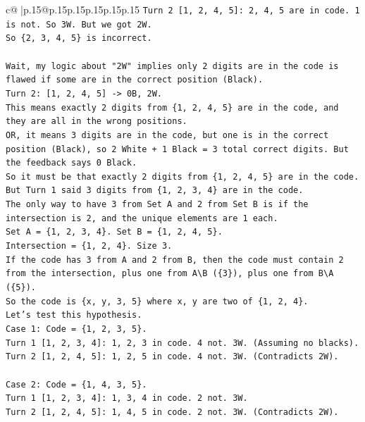 \documentclass{article}
\begin{document}
{\begin{supertabular}{c@{$\;$}|p{.15\linewidth}@{}p{.15\linewidth}p{.15\linewidth}p{.15\linewidth}p{.15\linewidth}p{.15\linewidth}}
{{{\texttt{Turn 2 {[}1, 2, 4, 5{]}: 2, 4, 5 are in code. 1 is not. So 3W. But we got 2W.} \\
\texttt{So \{2, 3, 4, 5\} is incorrect.} \\
\\ 
\texttt{Wait, my logic about "2W" implies only 2 digits are in the code is flawed if some are in the correct position (Black).} \\
\texttt{Turn 2: {[}1, 2, 4, 5{]} {-}> 0B, 2W.} \\
\texttt{This means exactly 2 digits from \{1, 2, 4, 5\} are in the code, and they are all in the wrong positions.} \\
\texttt{OR, it means 3 digits are in the code, but one is in the correct position (Black), so 2 White + 1 Black = 3 total correct digits. But the feedback says 0 Black.} \\
\texttt{So it must be that exactly 2 digits from \{1, 2, 4, 5\} are in the code.} \\
\texttt{But Turn 1 said 3 digits from \{1, 2, 3, 4\} are in the code.} \\
\texttt{The only way to have 3 from Set A and 2 from Set B is if the intersection is 2, and the unique elements are 1 each.} \\
\texttt{Set A = \{1, 2, 3, 4\}. Set B = \{1, 2, 4, 5\}.} \\
\texttt{Intersection = \{1, 2, 4\}. Size 3.} \\
\texttt{If the code has 3 from A and 2 from B, then the code must contain 2 from the intersection, plus one from A\textbackslash{}B (\{3\}), plus one from B\textbackslash{}A (\{5\}).} \\
\texttt{So the code is \{x, y, 3, 5\} where x, y are two of \{1, 2, 4\}.} \\
\texttt{Let's test this hypothesis.} \\
\texttt{Case 1: Code = \{1, 2, 3, 5\}.} \\
\texttt{Turn 1 {[}1, 2, 3, 4{]}: 1, 2, 3 in code. 4 not. 3W. (Assuming no blacks).} \\
\texttt{Turn 2 {[}1, 2, 4, 5{]}: 1, 2, 5 in code. 4 not. 3W. (Contradicts 2W).} \\
\\ 
\texttt{Case 2: Code = \{1, 4, 3, 5\}.} \\
\texttt{Turn 1 {[}1, 2, 3, 4{]}: 1, 3, 4 in code. 2 not. 3W.} \\
\texttt{Turn 2 {[}1, 2, 4, 5{]}: 1, 4, 5 in code. 2 not. 3W. (Contradicts 2W).} \\
\\ 
}}}
\end{supertabular}}
\end{document}
